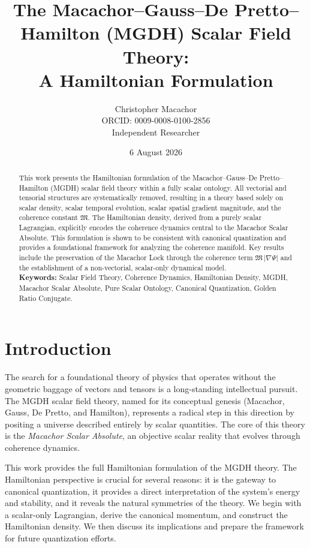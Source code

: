 \documentclass[11pt,a4paper]{article}
\title{\textbf{The Macachor--Gauss--De Pretto--Hamilton (MGDH) Scalar Field Theory:}\\A Hamiltonian Formulation}
\author{Christopher Macachor\\\small ORCID: 0009-0008-0100-2856\\\small Independent Researcher}
\date{6 August 2026}
\theoremstyle{definition}
\theoremstyle{plain}
\newcommand{\M}{\mathfrak{M}}
\begin{document}
\maketitle

\begin{abstract}
\noindent
This work presents the Hamiltonian formulation of the Macachor--Gauss--De Pretto--Hamilton (MGDH) scalar field theory within a fully scalar ontology. All vectorial and tensorial structures are systematically removed, resulting in a theory based solely on scalar density, scalar temporal evolution, scalar spatial gradient magnitude, and the coherence constant $\M$. The Hamiltonian density, derived from a purely scalar Lagrangian, explicitly encodes the coherence dynamics central to the Macachor Scalar Absolute. This formulation is shown to be consistent with canonical quantization and provides a foundational framework for analyzing the coherence manifold. Key results include the preservation of the Macachor Lock through the coherence term $\M\,|\nabla\Psi|$ and the establishment of a non-vectorial, scalar-only dynamical model.
\\[0.5em]
\textbf{Keywords:} Scalar Field Theory, Coherence Dynamics, Hamiltonian Density, MGDH, Macachor Scalar Absolute, Pure Scalar Ontology, Canonical Quantization, Golden Ratio Conjugate.
\end{abstract}

\section{Introduction}\label{sec:intro}

The search for a foundational theory of physics that operates without the geometric baggage of vectors and tensors is a long-standing intellectual pursuit. The MGDH scalar field theory, named for its conceptual genesis (Macachor, Gauss, De Pretto, and Hamilton), represents a radical step in this direction by positing a universe described entirely by scalar quantities. The core of this theory is the \emph{Macachor Scalar Absolute}, an objective scalar reality that evolves through coherence dynamics.

This work provides the full Hamiltonian formulation of the MGDH theory. The Hamiltonian perspective is crucial for several reasons: it is the gateway to canonical quantization, it provides a direct interpretation of the system's energy and stability, and it reveals the natural symmetries of the theory. We begin with a scalar-only Lagrangian, derive the canonical momentum, and construct the Hamiltonian density. We then discuss its implications and prepare the framework for future quantization efforts.
\end{document}

